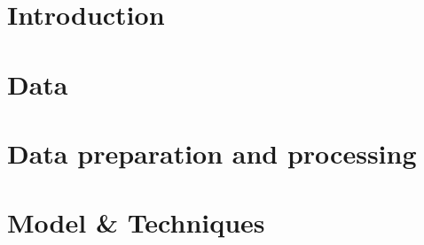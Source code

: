 \documentclass{article}
\begin{document}
\section{Introduction}

\section{Data}

\section{Data preparation and processing}

\section{Model \& Techniques}
\end{document}
